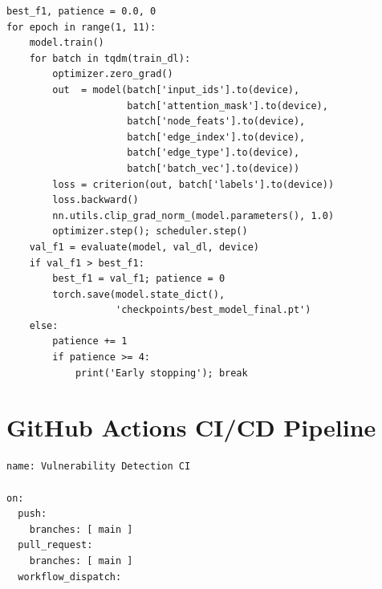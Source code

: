 \documentclass[12pt, letterpaper]{article}
\begin{document}
\begin{appendices}
\begin{lstlisting}[caption={step5\_train/train.py — core training loop},
                   label={lst:train}]
best_f1, patience = 0.0, 0
for epoch in range(1, 11):
    model.train()
    for batch in tqdm(train_dl):
        optimizer.zero_grad()
        out  = model(batch['input_ids'].to(device),
                     batch['attention_mask'].to(device),
                     batch['node_feats'].to(device),
                     batch['edge_index'].to(device),
                     batch['edge_type'].to(device),
                     batch['batch_vec'].to(device))
        loss = criterion(out, batch['labels'].to(device))
        loss.backward()
        nn.utils.clip_grad_norm_(model.parameters(), 1.0)
        optimizer.step(); scheduler.step()
    val_f1 = evaluate(model, val_dl, device)
    if val_f1 > best_f1:
        best_f1 = val_f1; patience = 0
        torch.save(model.state_dict(),
                   'checkpoints/best_model_final.pt')
    else:
        patience += 1
        if patience >= 4:
            print('Early stopping'); break
\end{lstlisting}

\section{GitHub Actions CI/CD Pipeline}
\label{app:cicd}

\begin{lstlisting}[style=yamlstyle,
                   caption={.github/workflows/evaluate.yml},
                   label={lst:cicd}]
name: Vulnerability Detection CI

on:
  push:
    branches: [ main ]
  pull_request:
    branches: [ main ]
  workflow_dispatch:


\end{lstlisting}
\end{appendices}
\end{document}
